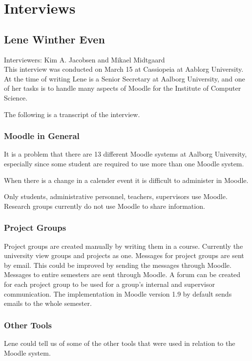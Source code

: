 \chapter{Interviews}

\section{Lene Winther Even}
Interviewers: Kim A. Jacobsen and Mikael Midtgaard\\


This interview was conducted on March 15\ths{} at Cassiopeia at Aablorg University.
At the time of writing Lene is a Senior Secretary at Aalborg University, and one of her tasks is to handle many aspects of Moodle for the Institute of Computer Science.

The following is a transcript of the interview.

\subsection{Moodle in General}
It is a problem that there are 13 different Moodle systems at Aalborg University, especially since some student are required to use more than one Moodle system.

When there is a change in a calender event it is difficult to administer in Moodle.

Only students, administrative personnel, teachers, supervisors use Moodle.
Research groups currently do not use Moodle to share information.




\subsection{Project Groups}
Project groups are created manually by writing them in a course.
Currently the university view groups and projects as one.
Messages for project groups are sent by email.
This could be improved by sending the messages through Moodle.
Messages to entire semesters are sent through Moodle.
A forum can be created for each project group to be used for a group's internal and supervisor communication.
The implementation in Moodle version 1.9 by default sends emails to the whole semester.




\subsection{Other Tools}
Lene could tell us of some of the other tools that were used in relation to the Moodle system.


